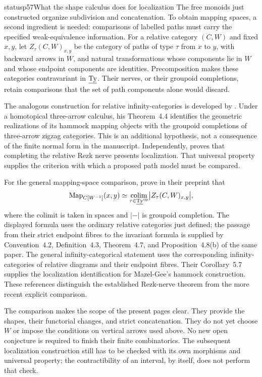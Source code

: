 \begin{dcomment}{status}{p57}{What the shape calculus does for localization}
The free monoids just constructed organize subdivision and concatenation. To obtain mapping spaces, a second ingredient is needed: comparisons of labelled paths must carry the specified weak-equivalence information. For a relative category $(C,W)$ and fixed $x,y$, let $Z_\tau(C,W)_{x,y}$ be the category of paths of type $\tau$ from $x$ to $y$, with backward arrows in $W$, and natural transformations whose components lie in $W$ and whose endpoint components are identities. Precomposition makes these categories contravariant in $\underline{\mathrm{Ty}}$. Their nerves, or their groupoid completions, retain comparisons that the set of path components alone would discard.

The analogous construction for relative infinity-categories is developed by \citet[Definitions~3.9 and~3.17]{MazelGee2018Hammocks}. Under a homotopical three-arrow calculus, his Theorem~4.4 identifies the geometric realizations of its hammock mapping objects with the groupoid completions of three-arrow zigzag categories. This is an additional hypothesis, not a consequence of the finite normal form in the manuscript. Independently, \citet[Theorem~3.8]{MazelGee2019Rezk} proves that completing the relative Rezk nerve presents localization. That universal property supplies the criterion with which a proposed path model must be compared.

For the general mapping-space comparison, \citet[Theorem~1.9 and Corollary~1.11]{ArakawaCnossen2026} prove in their preprint that
\[
 \operatorname{Map}_{C[W^{-1}]}(x,y)
 \simeq \operatorname*{colim}_{\tau\in\underline{\mathrm{Ty}}^{\mathrm{op}}}
          \bigl|Z_\tau(C,W)_{x,y}\bigr|,
\]
where the colimit is taken in spaces and $|{-}|$ is groupoid completion. The displayed formula uses the ordinary relative categories just defined; the passage from their strict endpoint fibres to the invariant formula is supplied by Convention~4.2, Definition~4.3, Theorem~4.7, and Proposition~4.8(b) of the same paper. The general infinity-categorical statement uses the corresponding infinity-categories of relative diagrams and their endpoint fibres. Their Corollary~5.7 supplies the localization identification for Mazel-Gee's hammock construction. These references distinguish the established Rezk-nerve theorem from the more recent explicit comparison.

The comparison makes the scope of the present pages clear. They provide the shapes, their functorial changes, and strict concatenation. They do not yet choose $W$ or impose the conditions on vertical arrows used above. No new open conjecture is required to finish their finite combinatorics. The subsequent localization construction still has to be checked with its own morphisms and universal property; the contractibility of an interval, by itself, does not perform that check.
\end{dcomment}

